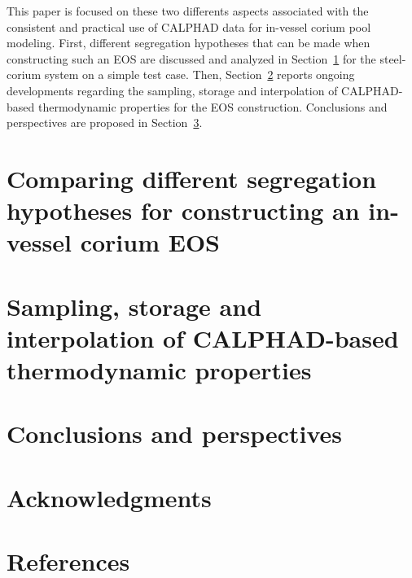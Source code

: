 \documentclass[11pt]{article}\usepackage{geometry} \geometry{letterpaper, margin=25.4mm}
\newcommand{\Sect}[1]{Section~\ref{sect:#1}}
\begin{document}
This paper is focused on these two differents aspects associated with the consistent and practical use of CALPHAD data for in-vessel corium pool modeling.
First, different segregation hypotheses that can be made when constructing such an EOS are discussed and analyzed in \Sect{analytical} for the steel-corium system on a simple test case. Then, \Sect{practical} reports ongoing developments regarding the sampling, storage and interpolation of CALPHAD-based thermodynamic properties for the EOS construction. Conclusions and perspectives are proposed in \Sect{concl}.

\section{Comparing different segregation hypotheses for constructing an in-vessel corium EOS} \label{sect:analytical}



\section{Sampling, storage and interpolation of CALPHAD-based thermodynamic properties} \label{sect:practical}

\section{Conclusions and perspectives} \label{sect:concl}

\section*{Acknowledgments}

\section*{References}

\end{document}
